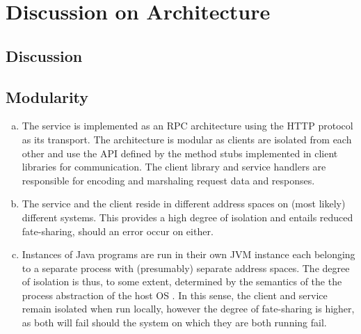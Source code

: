 \documentclass[11pt,a4paper,english]{article}
\begin{document}
\section{Discussion on Architecture}
\subsection{Discussion }
\subsection{Modularity}
\begin{enumerate}[(a)]
\item{The service is implemented as an RPC architecture using the HTTP protocol as its transport. The architecture is modular as clients are isolated from each other and use the API defined by the method stubs implemented in client libraries for communication. The client library and service handlers are responsible for encoding and marshaling request data and responses.}

\item{The service and the client reside in different address spaces on (most likely) different systems. This provides a high degree of isolation and entails reduced fate-sharing, should an error occur on either.}

\item{Instances of Java programs are run in their own JVM instance each belonging to a separate process with (presumably) separate address spaces. The degree of isolation is thus, to some extent, determined by the semantics of the the process abstraction of the host OS . In this sense, the client and service remain isolated when run locally, however the degree of fate-sharing is higher, as both will fail should the system on which they are both running fail.}
\end{enumerate}
\end{document}
